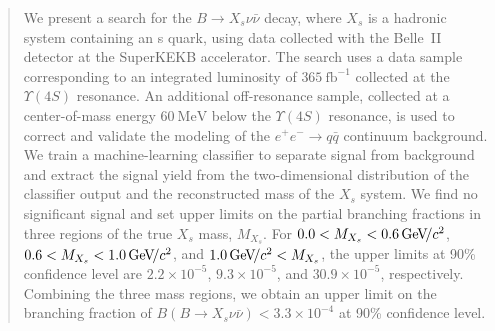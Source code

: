 \begin{abstract}
We present a search for the $B\rightarrow X_{s} \nu \bar{\nu}$ decay, where $X_{s}$ is a hadronic system containing an s quark, using data collected with the Belle~II detector at the SuperKEKB accelerator.
The search uses a data sample corresponding to an integrated luminosity of $365~\textrm{fb}^{-1}$ collected at the $\Upsilon(4S)$ resonance.
An additional off-resonance sample, collected at a center-of-mass energy $60~\textrm{MeV}$ below the $\Upsilon(4S)$ resonance, is used to correct and validate the modeling of the $e^+e^-\to q\bar{q}$ continuum background.
We train a machine-learning classifier to separate signal from background and extract the signal yield from the two-dimensional distribution of the classifier output and the reconstructed mass of the $X_{s}$ system.
We find no significant signal and set upper limits on the partial branching fractions in three regions of the true $X_{s}$ mass, $M_{X_{s}}$.
For $0.0 < M_{X_{s}} < 0.6\gevcc$, $0.6 < M_{X_{s}} < 1.0\gevcc$, and $1.0\gevcc < M_{X_{s}}$, the upper limits at 90\% confidence level are $2.2 \times 10^{-5}$, $9.3 \times 10^{-5}$, and $30.9 \times 10^{-5}$, respectively.
Combining the three mass regions, we obtain an upper limit on the branching fraction of $B(B \to X_s \nu \bar{\nu}) < 3.3 \times 10^{-4}$ at 90\% confidence level.
\end{abstract}